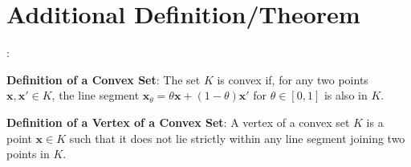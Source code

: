 \documentclass[9pt]{article}
\begin{document}
\section{Additional Definition/Theorem}:

\textbf{Definition of a Convex Set}: The set $K$ is convex if, for any two points $\mathbf{x},\mathbf{x'}\in K$, the line segment $\mathbf{x}_\theta=\theta\mathbf{x}+(1-\theta)\mathbf{x'}$ for $\theta\in[0,1]$ is also in $K$.

\textbf{Definition of a Vertex of a Convex Set}: A vertex of a convex set $K$ is a point $\mathbf{x}\in K$ such that it does not lie strictly within any line segment joining two points in $K$.
\end{document}

